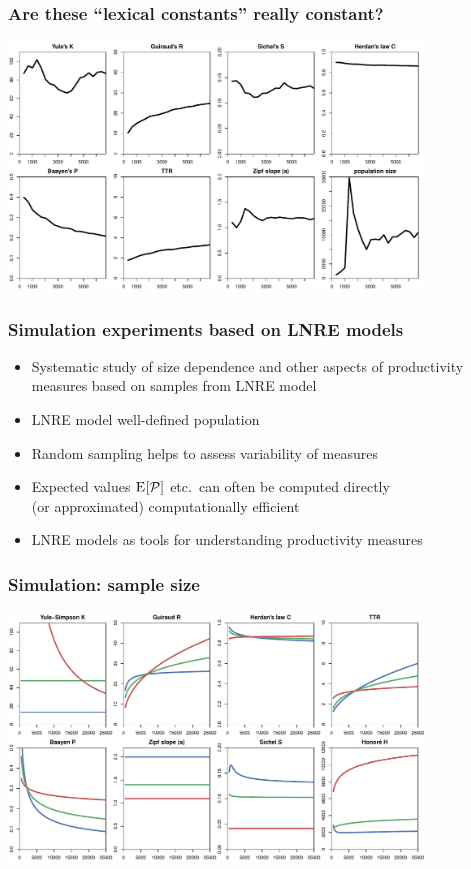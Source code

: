 \documentclass[handout,notes=show,t]{beamer} %
\begin{document}
\begin{frame}[c]
  \frametitle{Are these ``lexical constants'' really constant?}

  \centering
  \includegraphics[width=11cm]{img/bare_bncS_obs_lexical_constants}
\end{frame}

\begin{frame}
  \frametitle{Simulation experiments based on LNRE models}

  \begin{itemize}
  \item Systematic study of size dependence and other aspects of productivity
    measures based on samples from LNRE model
  \item LNRE model \so well-defined population
  \item Random sampling helps to assess variability of measures
  \item Expected values $\mathrm{E}_{}[\mathcal{P}]$ etc.\ can often be computed directly\\ (or approximated) \so computationally efficient
  \item[\So] LNRE models as tools for understanding productivity measures
  \end{itemize}
\end{frame}

\begin{frame}[c]
  \frametitle{Simulation: sample size}

  \centering
  \includegraphics[width=11cm]{img/lexconst_sample_size}
\end{frame}
\end{document}
